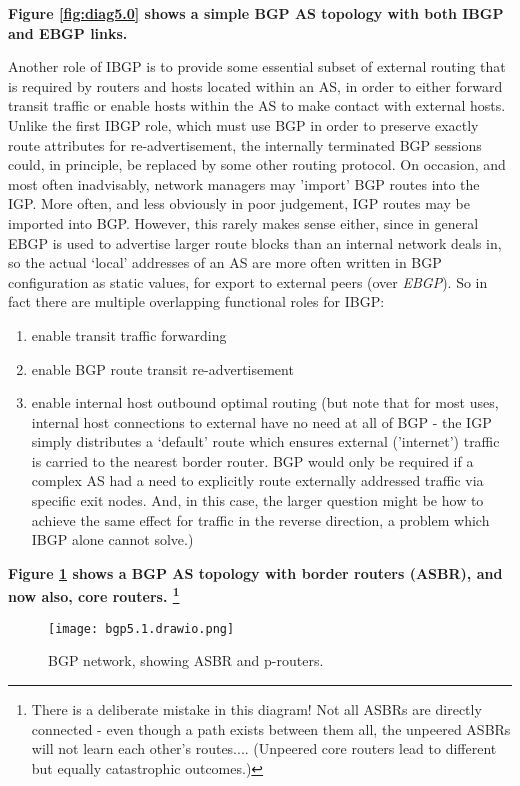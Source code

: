 \textbf{Figure \ref{fig:diag5.0} shows a simple BGP AS topology with both IBGP and EBGP links.}

Another role of IBGP is to provide some essential subset of external routing
that is required by routers and hosts located within an AS, in order to either
forward transit traffic or enable hosts within the AS to make contact with
external hosts. Unlike the first IBGP role, which must use BGP in order to
preserve exactly route attributes for re-advertisement, the internally
terminated BGP sessions could, in principle, be replaced by some other routing
protocol.  On occasion, and most often inadvisably, network managers may
'import' BGP routes into the IGP.  More often, and less obviously in poor
judgement, IGP routes may be imported into BGP.  However, this rarely makes
sense either, since in general EBGP is used to advertise larger route blocks
than an internal network deals in, so the actual `local' addresses of an AS are
more often written in BGP configuration as static values, for export to
external peers (over  \emph{EBGP}).  So in fact there are multiple overlapping
functional roles for IBGP:
\begin{enumerate}
	\item enable transit traffic forwarding
	\item enable BGP route transit re-advertisement
	\item enable internal host outbound optimal routing (but note that for most uses, internal host connections to external have no need at all of BGP - the IGP simply distributes a `default' route which ensures external ('internet') traffic is carried to the nearest border router.  BGP would only be required if a complex AS had a need to explicitly route externally addressed traffic via specific exit nodes. And, in this case, the larger question might be how to achieve the same effect for traffic in the reverse direction, a problem which IBGP alone cannot solve.)
\end{enumerate}

\textbf{Figure \ref{fig:diag5.1} shows a BGP AS topology with border routers (ASBR), and now also, core routers.
\footnote{There is a deliberate mistake in this diagram!  Not all ASBRs are directly connected - even though a path exists between them all, the unpeered ASBRs will not learn each other's routes.... (Unpeered core routers lead to different but equally catastrophic outcomes.)}}


\begin{figure}[H]
    \centering
    \texttt{[image: bgp5.1.drawio.png]}
    \caption{BGP network, showing ASBR and p-routers.}
    \label{fig:diag5.1}
\end{figure}

